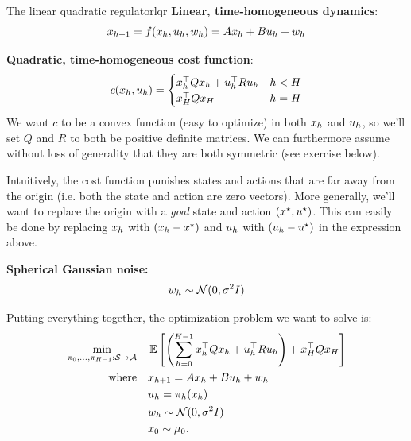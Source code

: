 \documentclass[../main/main]{subfiles}
\begin{document}
\begin{definition}{The linear quadratic regulator}{lqr}
    \textbf{Linear, time-homogeneous dynamics}: \[
        x_{h+1} = f(x_h, u_h, w_h) = A x_h + B u_h + w_h
    \]

    \noindent \textbf{Quadratic, time-homogeneous cost function}:
    \[
        c(x_h, u_h) = \begin{cases}
            x_h^\top Q x_h + u_h^\top R u_h & h < H \\
            x_H^\top Q x_H & h = H
        \end{cases}
    \]
    We want $c$ to be a convex function (easy to optimize) in both $x_h$ and $u_h$, so we'll set $Q$ and $R$ to both be positive definite matrices. We can furthermore assume without loss of generality that they are both symmetric (see exercise below).

    Intuitively, the cost function punishes states and actions that are far away from the origin (i.e. both the state and action are zero vectors). More generally, we'll want to replace the origin with a \emph{goal} state and action $(x^\star, u^\star)$. This can easily be done by replacing $x_h$ with $(x_h - x^\star)$ and $u_h$ with $(u_h - u^\star)$ in the expression above.
    

    \noindent \textbf{Spherical Gaussian noise:} \[ w_h \sim \mathcal{N}(0, \sigma^2 I) \]

    \noindent Putting everything together, the optimization problem we want to solve is:
    \begin{align*}
        \min_{\pi_0, \dots, \pi_{H-1} : \mathcal{S} \to \mathcal{A}} \quad & \operatorname*{\mathbb{E}} \left[ \left( \sum_{h=0}^{H-1} x_h^\top Q x_h + u_h^\top R u_h \right) + x_H^\top Q x_H \right] \\
        \textrm{where} \quad & x_{h+1} = A x_h + B u_h + w_h \\
        & u_h = \pi_h (x_h) \\
        & w_h \sim \mathcal{N}(0, \sigma^2 I) \\
        & x_0 \sim \mu_0.
    \end{align*}
\end{definition}
\end{document}
